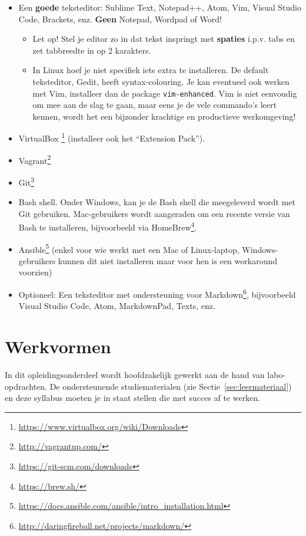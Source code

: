 \begin{itemize}
  \item Een \textbf{goede} teksteditor: Sublime Text, Notepad++, Atom, Vim, Visual Studio Code, Brackets, enz. \textbf{Geen} Notepad, Wordpad of Word!
  \begin{itemize}
    \item Let op! Stel je editor zo in dat tekst inspringt met \textbf{spaties} i.p.v. tabs en zet tabbreedte in op 2 karakters.
    \item In Linux hoef je niet specifiek iets extra te installeren. De default teksteditor, Gedit, heeft syntax-colouring. Je kan eventueel ook werken met Vim, installeer dan de package \texttt{vim-enhanced}. Vim is niet eenvoudig om mee aan de slag te gaan, maar eens je de vele commando's leert kennen, wordt het een bijzonder krachtige en productieve werkomgeving!
  \end{itemize}
  \item VirtualBox \footnote{\url{https://www.virtualbox.org/wiki/Downloads}} (installeer ook het ``Extension Pack'').
  \item Vagrant\footnote{\url{http://vagrantup.com/}}
  \item Git\footnote{\url{https://git-scm.com/downloads}}
  \item Bash shell. Onder Windows, kan je de Bash shell die meegeleverd wordt met Git gebruiken. Mac-gebruikers wordt aangeraden om een recente versie van Bash te installeren, bijvoorbeeld via HomeBrew\footnote{\url{https://brew.sh/}}.
  \item Ansible\footnote{\url{https://docs.ansible.com/ansible/intro_installation.html}} (enkel voor wie werkt met een Mac of Linux-laptop, Windows-gebruikers kunnen dit niet installeren maar voor hen is een workaround voorzien)
  \item Optioneel: Een teksteditor met ondersteuning voor Markdown\footnote{\url{http://daringfireball.net/projects/markdown/}}, bijvoorbeeld Visual Studio Code, Atom, MarkdownPad, Texts, enz.
\end{itemize}

\section{Werkvormen}
\label{sec:werkvormen}

In dit opleidingsonderdeel wordt hoofdzakelijk gewerkt aan de hand van labo-opdrachten. De ondersteunende studiematerialen (zie Sectie~\ref{sec:leermateriaal}) en deze syllabus moeten je in staat stellen die met succes af te werken.

